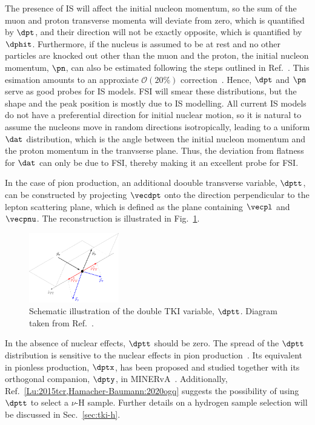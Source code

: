 The presence of IS will affect the initial nucleon momentum, so the sum of the muon and proton transverse momenta will deviate from zero, which is quantified by $\dpt$, and their direction will not be exactly opposite, which is quantified by $\dphit$.
Furthermore, if the nucleus is assumed to be at rest and no other particles are knocked out other than the muon and the proton, the initial nucleon momentum, $\pn$, can also be estimated following the steps outlined in Ref.~\cite{Furmanski:2016wqo, Lu:2019nmf}. 
This esimation amounts to an approxiate  $\mathcal{O}(20\%)$ correction~\cite{Yang:2023dxk}. 
Hence, $\dpt$ and $\pn$ serve as good probes for IS models.
FSI will smear these distributions, but the shape and the peak position is mostly due to IS modelling.
All current IS models do not have a preferential direction for initial nuclear motion, so it is natural to assume the nucleons move in random directions isotropically, leading to a uniform $\dat$ distribution, which is the angle between the initial nucleon momentum and the proton momentum in the tranvserse plane. 
Thus, the deviation from flatness for $\dat$ can only be due to FSI, thereby making it an excellent probe for FSI. 
 
In the case of pion production, an additional doouble transverse variable, $\dptt$, can be constructed by projecting $\vecdpt$ onto the direction perpendicular to the lepton scattering plane, which is defined as the plane containing $\vecpl$ and $\vecpnu$.
The reconstruction is illustrated in Fig.~\ref{fig:dtki}.
\begin{figure}
    \centering
    \includegraphics[width=0.35\textwidth]{figures/dptt.pdf}
    \caption{\label{fig:dtki} Schematic illustration of the double TKI variable, $\dptt$. Diagram taken from Ref.~\cite{T2K:2021naz}.}
\end{figure}
In the absence of nuclear effects, $\dptt$ should be zero.
The spread of the $\dptt$ distribution is sensitive to the nuclear effects in pion production~\cite{MINERvA:2020anu, T2K:2021naz}.
Its equivalent in pionless production, $\dptx$, has been proposed and studied together with its orthogonal companion, $\dpty$, in MINERvA~\cite{MINERvA:2019ope}.
Additionally, Ref.~\ref{Lu:2015tcr,Hamacher-Baumann:2020ogq} suggests the possibility of using $\dptt$ to select a $\nu$-H sample.
Further details on a hydrogen sample selection will be discussed in Sec.~\ref{sec:tki-h}.

